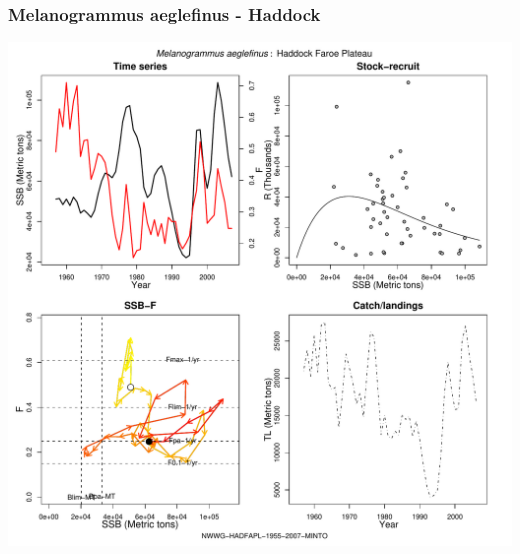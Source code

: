 \subsubsection{Melanogrammus aeglefinus - Haddock}
\begin{center}
\includegraphics[width=1.2\textwidth]{../R/figures/NWWG-HADFAPL-1955-2007-MINTO.pdf}
\end{center}

